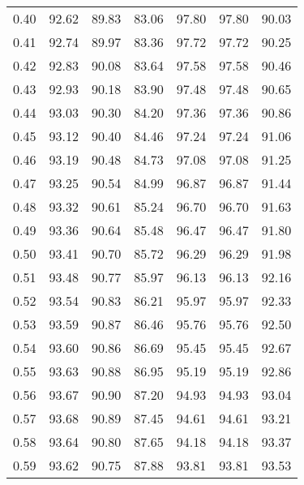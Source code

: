 \begin{tabular}{|c|c|c|c|c|c|c|}
      0.40 &     92.62 &     89.83 &      83.06 &   97.80 &      97.80 &         90.03 \\
      0.41 &     92.74 &     89.97 &      83.36 &   97.72 &      97.72 &         90.25 \\
      0.42 &     92.83 &     90.08 &      83.64 &   97.58 &      97.58 &         90.46 \\
      0.43 &     92.93 &     90.18 &      83.90 &   97.48 &      97.48 &         90.65 \\
      0.44 &     93.03 &     90.30 &      84.20 &   97.36 &      97.36 &         90.86 \\
      0.45 &     93.12 &     90.40 &      84.46 &   97.24 &      97.24 &         91.06 \\
      0.46 &     93.19 &     90.48 &      84.73 &   97.08 &      97.08 &         91.25 \\
      0.47 &     93.25 &     90.54 &      84.99 &   96.87 &      96.87 &         91.44 \\
      0.48 &     93.32 &     90.61 &      85.24 &   96.70 &      96.70 &         91.63 \\
      0.49 &     93.36 &     90.64 &      85.48 &   96.47 &      96.47 &         91.80 \\
      0.50 &     93.41 &     90.70 &      85.72 &   96.29 &      96.29 &         91.98 \\
      0.51 &     93.48 &     90.77 &      85.97 &   96.13 &      96.13 &         92.16 \\
      0.52 &     93.54 &     90.83 &      86.21 &   95.97 &      95.97 &         92.33 \\
      0.53 &     93.59 &     90.87 &      86.46 &   95.76 &      95.76 &         92.50 \\
      0.54 &     93.60 &     90.86 &      86.69 &   95.45 &      95.45 &         92.67 \\
      0.55 &     93.63 &     90.88 &      86.95 &   95.19 &      95.19 &         92.86 \\
      0.56 &     93.67 &     90.90 &      87.20 &   94.93 &      94.93 &         93.04 \\
      0.57 &     93.68 &     90.89 &      87.45 &   94.61 &      94.61 &         93.21 \\
      0.58 &     93.64 &     90.80 &      87.65 &   94.18 &      94.18 &         93.37 \\
      0.59 &     93.62 &     90.75 &      87.88 &   93.81 &      93.81 &         93.53 \\

\end{tabular}
